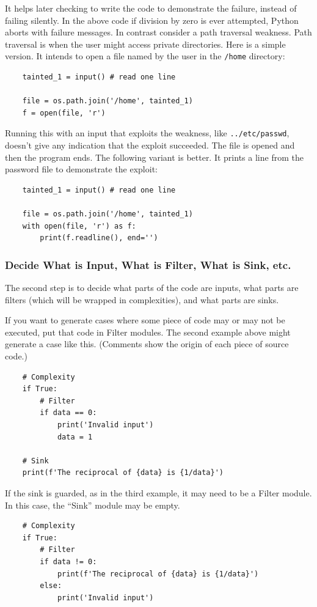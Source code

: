 \documentclass[12pt]{article}
\begin{document}
It helps later checking to write the code to demonstrate the failure, instead of
failing silently.  In the above code if division by zero is ever attempted, Python
aborts with failure messages.  In contrast consider a path traversal weakness.  Path
traversal is when the user might access private directories.  Here is a simple
version.  It intends to open a file named by the user in the \verb|/home| directory:
\begin{verbatim}
    tainted_1 = input() # read one line

    file = os.path.join('/home', tainted_1)
    f = open(file, 'r')
\end{verbatim}
Running this with an input that exploits the weakness, like
\verb|../etc/passwd|, doesn't give any indication that the exploit succeeded.  The
file is opened and then the program ends.  The following variant is better.  It
prints a line from the password file to demonstrate the exploit:
\begin{verbatim}
    tainted_1 = input() # read one line

    file = os.path.join('/home', tainted_1)
    with open(file, 'r') as f:
        print(f.readline(), end='')
\end{verbatim}


\subsubsection{Decide What is Input, What is Filter, What is Sink, etc.}

The second step is to decide what parts of the code are inputs, what parts are
filters (which will be wrapped in complexities), and what parts are sinks.

If you want to generate cases where some piece of code may or may not be executed,
put that code in Filter modules.  The second example above might generate a case
like this.  (Comments show the origin of each piece of source code.)
\begin{verbatim}
    # Complexity
    if True:
        # Filter
        if data == 0:
            print('Invalid input')
            data = 1

    # Sink
    print(f'The reciprocal of {data} is {1/data}')
\end{verbatim}

If the sink is guarded, as in the third example, it may need to be a Filter module.
In this case, the ``Sink'' module may be empty.
\begin{verbatim}
    # Complexity
    if True:
        # Filter
        if data != 0:
            print(f'The reciprocal of {data} is {1/data}')
        else:
            print('Invalid input')
\end{verbatim}
\end{document}
